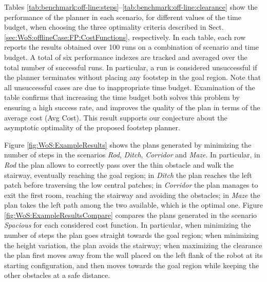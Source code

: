 Tables \ref{tab:benchmark:off-line:steps}--\ref{tab:benchmark:off-line:clearance}
show the performance of the planner in each scenario, for different values of the time budget, when choosing the three optimality criteria described in Sect. \ref{sec:WoS:offlineCase:FP:CostFunctions}, respectively.
In each table, each row reports the results obtained over 100 runs on a combination of scenario and time budget. A total of six performance indexes are tracked and averaged over the total number of successful runs.
In particular, a run is considered unsuccessful if the planner terminates without placing any footstep in the goal region.
Note that all unsuccessful cases are due to inappropriate time budget.
Examination of the table confirms that increasing the time budget both solves this problem by ensuring a high success rate, and improves the quality of the plan in terms of the average cost (Avg Cost). 
This result supports our conjecture about the asymptotic optimality of the proposed footstep planner.

Figure \ref{fig:WoS:ExampleResults} shows the plans generated by minimizing the number of steps in the scenarios \textit{Rod}, \textit{Ditch}, \textit{Corridor} and \textit{Maze}.
In particular, in \textit{Rod} the plan allows to correctly pass over the thin obstacle and walk the stairway, eventually reaching the goal region; in \textit{Ditch} the plan reaches the left patch before traversing the low central patches; in \textit{Corridor} the plan manages to exit the first room, reaching the stairway and avoiding the obstacles; in \textit{Maze} the plan takes the left path among the two available, which is the optimal one. 
Figure \ref{fig:WoS:ExampleResultsCompare} compares the plans generated in the scenario \textit{Spacious} for each considered cost function. 
In particular, when minimizing the number of steps the plan goes straight towards the goal region; when minimizing the height variation, the plan avoids the stairway; when maximizing the clearance the plan first moves away from the wall placed on the left flank of the robot at its starting configuration, and then moves towards the goal region while keeping the other obstacles at a safe distance.

